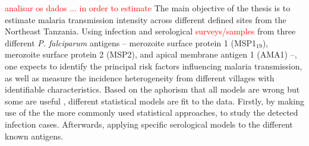 \textcolor{red}{analisar os dados ... in order to estimate}
The main objective of the thesis is to estimate malaria transmission intensity across different defined sites from the Northeast Tanzania.
Using infection and serological \textcolor{red}{surveys/samples} from three different \textit{P. falciparum} antigens -- merozoite surface protein 1 (MSP1$_{19}$), merozoite surface protein 2 (MSP2), and apical membrane antigen 1 (AMA1) --, one expects to identify the principal risk factors influencing malaria transmission, as well as measure the incidence heterogeneity from different villages with identifiable characteristics.
Based on the aphorism that all models are wrong but some are useful \cite{box2005statistics}, different statistical models are fit to the data.
Firstly, by making use of the the more commonly used statistical approaches, to study the detected infection cases.
Afterwards, applying specific serological models to the different known antigens.

